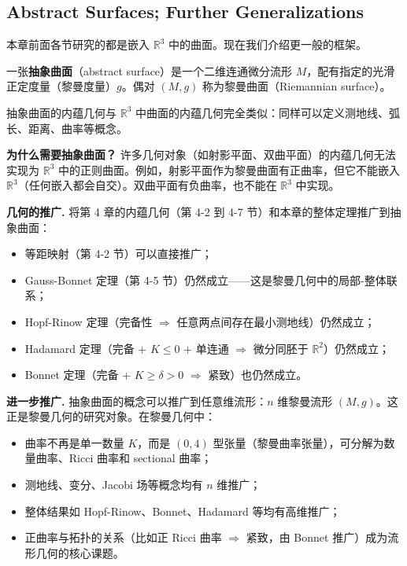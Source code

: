 \begin{Remark}
\section{Abstract Surfaces; Further Generalizations}\label{sec:abstract-surfaces}

本章前面各节研究的都是嵌入 $\mathbb{R}^3$ 中的曲面。现在我们介绍更一般的框架。

\begin{Definition}[抽象曲面]\label{def:abstract-surface}
一张\textbf{抽象曲面}（abstract surface）是一个二维连通微分流形 $M$，配有指定的光滑正定度量（黎曼度量）$g$。偶对 $(M,g)$ 称为黎曼曲面（Riemannian surface）。
\end{Definition}

抽象曲面的内蕴几何与 $\mathbb{R}^3$ 中曲面的内蕴几何完全类似：同样可以定义测地线、弧长、距离、曲率等概念。

\textbf{为什么需要抽象曲面？} 许多几何对象（如射影平面、双曲平面）的内蕴几何无法实现为 $\mathbb{R}^3$ 中的正则曲面。例如，射影平面作为黎曼曲面有正曲率，但它不能嵌入 $\mathbb{R}^3$（任何嵌入都会自交）。双曲平面有负曲率，也不能在 $\mathbb{R}^3$ 中实现。

\textbf{几何的推广.} 将第 4 章的内蕴几何（第 4-2 到 4-7 节）和本章的整体定理推广到抽象曲面：
\begin{itemize}
  \item 等距映射（第 4-2 节）可以直接推广；
  \item Gauss-Bonnet 定理（第 4-5 节）仍然成立——这是黎曼几何中的局部-整体联系；
  \item Hopf-Rinow 定理（完备性 $\Rightarrow$ 任意两点间存在最小测地线）仍然成立；
  \item Hadamard 定理（完备 + $K \leq 0$ + 单连通 $\Rightarrow$ 微分同胚于 $\mathbb{R}^2$）仍然成立；
  \item Bonnet 定理（完备 + $K \geq \delta > 0$ $\Rightarrow$ 紧致）也仍然成立。
\end{itemize}

\textbf{进一步推广.} 抽象曲面的概念可以推广到任意维流形：$n$ 维黎曼流形 $(M,g)$。这正是黎曼几何的研究对象。在黎曼几何中：
\begin{itemize}
  \item 曲率不再是单一数量 $K$，而是 $(0,4)$ 型张量（黎曼曲率张量），可分解为数量曲率、Ricci 曲率和 sectional 曲率；
  \item 测地线、变分、Jacobi 场等概念均有 $n$ 维推广；
  \item 整体结果如 Hopf-Rinow、Bonnet、Hadamard 等均有高维推广；
  \item 正曲率与拓扑的关系（比如正 Ricci 曲率 $\Rightarrow$ 紧致，由 Bonnet 推广）成为流形几何的核心课题。
\end{itemize}


\end{Remark}
